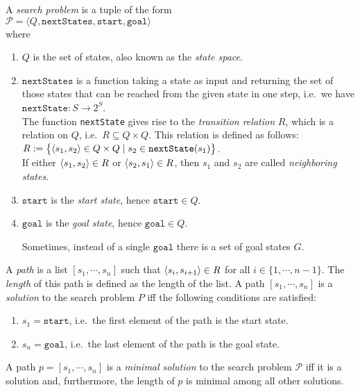 \begin{Definition}
  A \emph{\color{blue}search problem} is a tuple of the form
  \\[0.2cm]
  \hspace*{1.3cm}
  $\mathcal{P} = \langle Q,\mathtt{nextStates}, \mathtt{start}, \mathtt{goal}\rangle$
  \\[0.2cm]
  where
  \begin{enumerate}
  \item $Q$ is the set of states, also known as the \emph{\color{blue}state space}.
  \item $\texttt{nextStates}$ is a function taking a state as input and returning the set of those
        states that can be reached from the given state in one step,
        i.e.~we have
        \\[0.2cm]
        \hspace*{1.3cm}
        $\texttt{nextState}:S \rightarrow 2^S$.
        \\[0.2cm]
        The function \texttt{nextState} gives rise to the \emph{\color{blue}transition relation} $R$, which is a
        relation on $Q$, i.e.~$R \subseteq Q \times Q$.  This relation is defined as follows:
        \\[0.2cm]
        \hspace*{1.3cm}
        $R := \bigl\{ \pair(s_1, s_2) \in Q \times Q \mid s_2 \in \mathtt{nextState}(s_1) \bigr\}$.
        \\[0.2cm]
        If either $\pair(s_1, s_2) \in R$ or $\pair(s_2, s_1) \in R$, then  $s_1$ and $s_2$ are
        called \emph{\color{blue}neighboring states}.
  \item $\mathtt{start}$ is the \emph{\color{blue}start state}, hence $\mathtt{start} \in Q$. 
  \item $\mathtt{goal}$ is the \emph{\color{blue}goal state}, hence $\mathtt{goal} \in Q$.

        Sometimes, instead of a single $\mathtt{goal}$ there is a set of goal states $G$.
  \end{enumerate}
  A \emph{\color{blue}path} is a list $[s_1, \cdots, s_n]$ such that $\pair(s_i, s_{i+1}) \in R$ for all $i \in
  \{1,\cdots,n-1\}$. 
  The \emph{\color{blue}length} of this path is defined as the length of the list. 
  A path $[s_1, \cdots, s_n]$ is a \emph{\color{blue}solution} to the search problem $P$ iff the following
  conditions are satisfied:
  \begin{enumerate}
  \item $s_1 = \mathtt{start}$, i.e.~the first element of the path is the start state.
  \item $s_n = \mathtt{goal}$, i.e.~the last element of the path is the goal state. 
  \end{enumerate}
  A path $p = [s_1, \cdots, s_n]$ is a \emph{\color{blue}minimal solution} to the search problem $\mathcal{P}$ iff it is a
  solution and, furthermore, the length of $p$ is minimal among all other solutions. \eoxs
\end{Definition}

